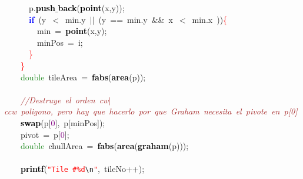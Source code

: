\mbox{}\ \ \ \ \ \ p\textcolor{BrickRed}{.}\textbf{\textcolor{Black}{push$\_$back}}\textcolor{BrickRed}{(}\textbf{\textcolor{Black}{point}}\textcolor{BrickRed}{(}x\textcolor{BrickRed}{,}y\textcolor{BrickRed}{));}\ \ \ \ \ \  \\
\mbox{}\ \ \ \ \ \ \textbf{\textcolor{Blue}{if}}\ \textcolor{BrickRed}{(}y\ \textcolor{BrickRed}{$<$}\ min\textcolor{BrickRed}{.}y\ \textcolor{BrickRed}{$|$$|$}\ \textcolor{BrickRed}{(}y\ \textcolor{BrickRed}{==}\ min\textcolor{BrickRed}{.}y\ \textcolor{BrickRed}{\&\&}\ x\ \textcolor{BrickRed}{$<$}\ min\textcolor{BrickRed}{.}x\ \textcolor{BrickRed}{))}\textcolor{Red}{\{} \\
\mbox{}\ \ \ \ \ \ \ \ min\ \textcolor{BrickRed}{=}\ \textbf{\textcolor{Black}{point}}\textcolor{BrickRed}{(}x\textcolor{BrickRed}{,}y\textcolor{BrickRed}{);} \\
\mbox{}\ \ \ \ \ \ \ \ minPos\ \textcolor{BrickRed}{=}\ i\textcolor{BrickRed}{;} \\
\mbox{}\ \ \ \ \ \ \textcolor{Red}{\}} \\
\mbox{}\ \ \ \ \textcolor{Red}{\}} \\
\mbox{}\ \ \ \ \textcolor{ForestGreen}{double}\ tileArea\ \textcolor{BrickRed}{=}\ \textbf{\textcolor{Black}{fabs}}\textcolor{BrickRed}{(}\textbf{\textcolor{Black}{area}}\textcolor{BrickRed}{(}p\textcolor{BrickRed}{));} \\
\mbox{} \\
\mbox{}\ \ \ \ \textit{\textcolor{Brown}{//Destruye\ el\ orden\ cw$|$ccw\ poligono,\ pero\ hay\ que\ hacerlo\ por\ que\ Graham\ necesita\ el\ pivote\ en\ p[0]}} \\
\mbox{}\ \ \ \ \textbf{\textcolor{Black}{swap}}\textcolor{BrickRed}{(}p\textcolor{BrickRed}{[}\textcolor{Purple}{0}\textcolor{BrickRed}{],}\ p\textcolor{BrickRed}{[}minPos\textcolor{BrickRed}{]);} \\
\mbox{}\ \ \ \ pivot\ \textcolor{BrickRed}{=}\ p\textcolor{BrickRed}{[}\textcolor{Purple}{0}\textcolor{BrickRed}{];} \\
\mbox{}\ \ \ \ \textcolor{ForestGreen}{double}\ chullArea\ \textcolor{BrickRed}{=}\ \textbf{\textcolor{Black}{fabs}}\textcolor{BrickRed}{(}\textbf{\textcolor{Black}{area}}\textcolor{BrickRed}{(}\textbf{\textcolor{Black}{graham}}\textcolor{BrickRed}{(}p\textcolor{BrickRed}{)));} \\
\mbox{}\ \ \ \  \\
\mbox{}\ \ \ \ \textbf{\textcolor{Black}{printf}}\textcolor{BrickRed}{(}\texttt{\textcolor{Red}{"{}Tile\ \#\%d}}\texttt{\textcolor{CarnationPink}{\textbackslash{}n}}\texttt{\textcolor{Red}{"{}}}\textcolor{BrickRed}{,}\ tileNo\textcolor{BrickRed}{++);} \\
